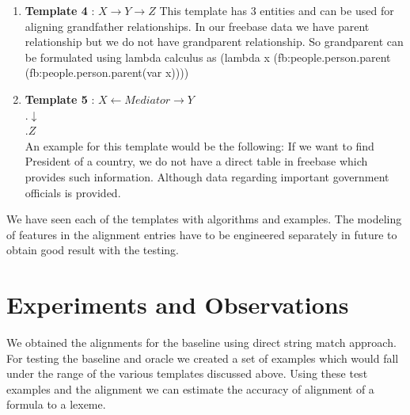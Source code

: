 \documentclass[12pt, a4paper]{article}
\begin{document}
\begin{enumerate}
{\bf formula} = \\"(lambda x (fb:people.person.spouse \\(fb:people.person.gender.female(var x))))"\\
{\bf lexeme} = "wife of"\\
{\bf source} = "ALIGNMENT"\\
{\bf features} = \{FB\_typed\_size :aaa, Intersection\_size\_typed:bbb, "NL-size":ccc\}

The algorithm used to align the formula is still similar to the ones discussed above but we now use a unique lambda function which would represent the formula. This is yet to be implemented and tested.

A few more templates which would be our targets for the end project are discussed with an example.

\item {\bf Template 4} : $X \rightarrow Y \rightarrow Z$
This template has 3 entities and can be used for aligning grandfather relationships. In our freebase data we have parent relationship but we do not have grandparent relationship. So grandparent can be formulated using lambda calculus as (lambda x (fb:people.person.parent (fb:people.person.parent(var x))))

\item {\bf Template 5} : $X\leftarrow Mediator \rightarrow Y$\\
.\qquad\qquad\qquad\qquad\quad$\downarrow$\\
.\qquad\qquad\qquad\qquad\quad$Z$\\
An example for this template would be the following: If we want to find President of a country, we do not have a direct table in freebase which provides such information. Although data regarding important government officials is provided.
	
\end{enumerate}

We have seen each of the templates with algorithms and examples. The modeling of features in the alignment entries have to be engineered separately in future to obtain good result with the testing.

\section{Experiments and Observations}
We obtained the alignments for the baseline using direct string match approach. For testing the baseline and oracle we created a set of examples which would fall under the range of the various templates discussed above. Using these test examples and the alignment we can estimate the accuracy of alignment of a formula to a lexeme.
\end{document}
